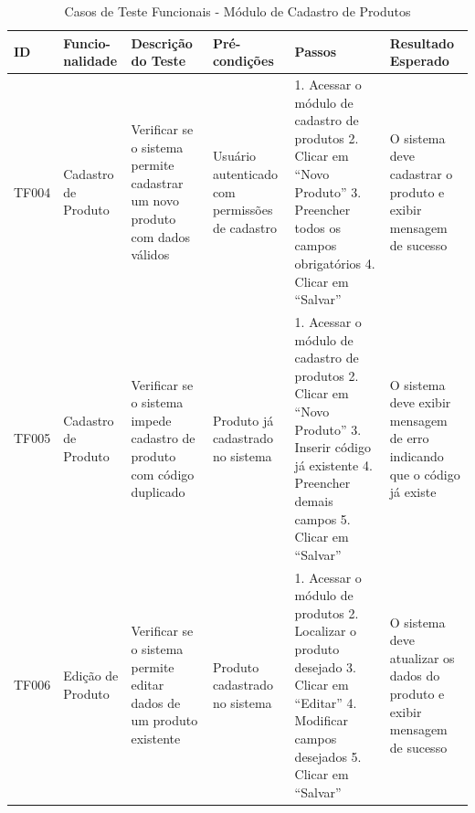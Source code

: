 \documentclass[
	12pt,				%
	openany,			%
	twoside,			%
	a4paper,			%
	english,			%
	brazil				%
	]{abntex2}
\begin{document}
\FloatBarrier

\begin{table}[htbp]

\caption{Casos de Teste Funcionais - Módulo de Cadastro de Produtos}
\begin{tabular}{|p{1cm}|p{1.7cm}|p{3.2cm}|p{2.1cm}|p{3.5cm}|p{3.5cm}|}
\hline
\textbf{ID} & \textbf{Funcio-nalidade} & \textbf{Descrição do Teste} & \textbf{Pré-condições} & \textbf{Passos} & \textbf{Resultado Esperado} \\
\hline
TF004 & Cadastro de Produto & Verificar se o sistema permite cadastrar um novo produto com dados válidos & Usuário autenticado com permissões de cadastro & 
1. Acessar o módulo de cadastro de produtos
2. Clicar em ``Novo Produto''
3. Preencher todos os campos obrigatórios
4. Clicar em ``Salvar'' & 
O sistema deve cadastrar o produto e exibir mensagem de sucesso \\
\hline
TF005 & Cadastro de Produto & Verificar se o sistema impede cadastro de produto com código duplicado & Produto já cadastrado no sistema & 
1. Acessar o módulo de cadastro de produtos
2. Clicar em ``Novo Produto''
3. Inserir código já existente
4. Preencher demais campos
5. Clicar em ``Salvar'' & 
O sistema deve exibir mensagem de erro indicando que o código já existe \\
\hline
TF006 & Edição de Produto & Verificar se o sistema permite editar dados de um produto existente & Produto cadastrado no sistema & 
1. Acessar o módulo de produtos
2. Localizar o produto desejado
3. Clicar em ``Editar''
4. Modificar campos desejados
5. Clicar em ``Salvar'' & 
O sistema deve atualizar os dados do produto e exibir mensagem de sucesso \\
\hline
\end{tabular}
\end{table}

\FloatBarrier
\end{document}
